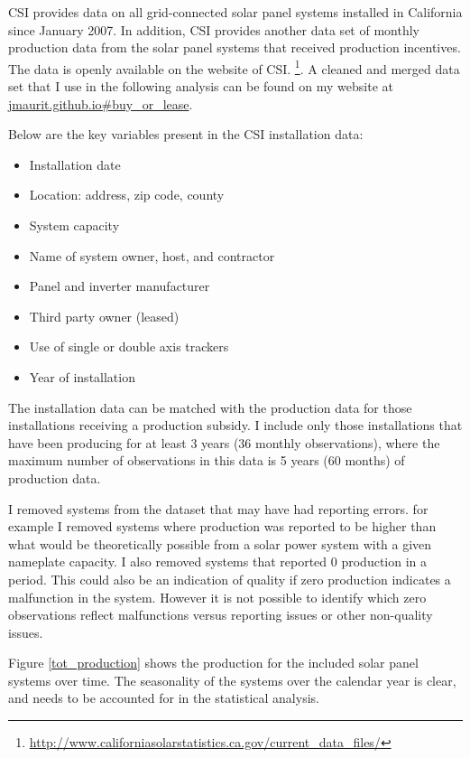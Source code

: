 \documentclass[12pt]{article}
\begin{document}
CSI provides data on all grid-connected solar panel systems installed in California since January 2007. In addition, CSI provides another data set of monthly production data from the solar panel systems that received production incentives. The data is openly available on the website of CSI. \footnote{\url{http://www.californiasolarstatistics.ca.gov/current_data_files/}}. A cleaned and merged data set that I use in the following analysis can be found on my website at \url{jmaurit.github.io#buy_or_lease}.

Below are the key variables present in the CSI installation data:

\begin{itemize}
\item Installation date
\item Location: address, zip code, county
\item System capacity
\item Name of system owner, host, and contractor
\item Panel and inverter manufacturer
\item Third party owner (leased)
\item Use of single or double axis trackers
\item Year of installation
\end{itemize}

The installation data can be matched with the production data for those installations receiving a production subsidy. I include only those installations that have been producing for at least 3 years (36 monthly observations), where the maximum number of observations in this data is 5 years (60 months) of production data.

I removed systems from the dataset that may have had reporting errors. for example I removed systems where production was reported to be higher than what would be theoretically possible from a solar power system with a given nameplate capacity. I also removed systems that reported 0 production in a period. This could also be an indication of quality if zero production indicates a malfunction in the system. However it is not possible to identify which zero observations reflect malfunctions versus reporting issues or other non-quality issues.

Figure \ref{tot_production} shows the production for the included solar panel systems over time. The seasonality of the systems over the calendar year is clear, and needs to be accounted for in the statistical analysis.
\end{document}
